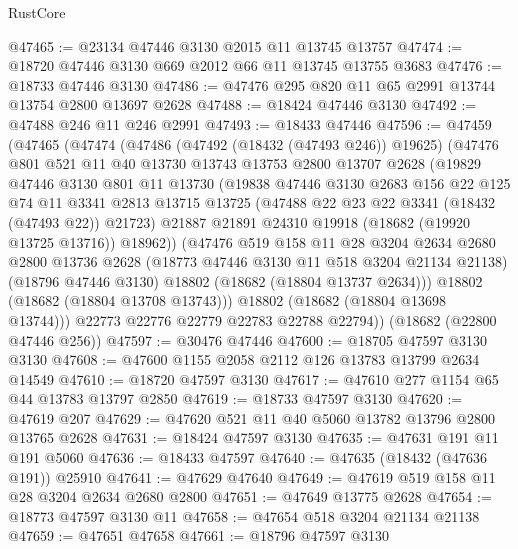 \begin{lexlean}{RustCore}
\begin{coremodule}
@47465 := @23134 @47446 @3130 @2015 @11 @13745 @13757
@47474 := @18720 @47446 @3130 @669 @2012 @66 @11 @13745 @13755 @3683
@47476 := @18733 @47446 @3130
@47486 := @47476 @295 @820 @11 @65 @2991 @13744 @13754 @2800 @13697 @2628
@47488 := @18424 @47446 @3130
@47492 := @47488 @246 @11 @246 @2991
@47493 := @18433 @47446
@47596 := @47459
    (@47465
      (@47474
        (@47486
          (@47492 (@18432 (@47493 @246)) @19625)
          (@47476
            @801
            @521
            @11
            @40
            @13730
            @13743
            @13753
            @2800
            @13707
            @2628
            (@19829
              @47446
              @3130
              @801
              @11
              @13730
              (@19838
                @47446
                @3130
                @2683
                @156
                @22
                @125
                @74
                @11
                @3341
                @2813
                @13715
                @13725
                (@47488 @22 @23 @22 @3341 (@18432 (@47493 @22)) @21723)
                @21887
                @21891
                @24310
                @19918
                (@18682 (@19920 @13725 @13716))
                @18962))
            (@47476
              @519
              @158
              @11
              @28
              @3204
              @2634
              @2680
              @2800
              @13736
              @2628
              (@18773 @47446 @3130 @11 @518 @3204 @21134 @21138)
              (@18796 @47446 @3130)
              @18802
              (@18682 (@18804 @13737 @2634)))
            @18802
            (@18682 (@18804 @13708 @13743)))
          @18802
          (@18682 (@18804 @13698 @13744)))
        @22773
        @22776
        @22779
        @22783
        @22788
        @22794))
    (@18682 (@22800 @47446 @256))
@47597 := @30476 @47446
@47600 := @18705 @47597 @3130 @3130
@47608 := @47600 @1155 @2058 @2112 @126 @13783 @13799 @2634 @14549
@47610 := @18720 @47597 @3130
@47617 := @47610 @277 @1154 @65 @44 @13783 @13797 @2850
@47619 := @18733 @47597 @3130
@47620 := @47619 @207
@47629 := @47620 @521 @11 @40 @5060 @13782 @13796 @2800 @13765 @2628
@47631 := @18424 @47597 @3130
@47635 := @47631 @191 @11 @191 @5060
@47636 := @18433 @47597
@47640 := @47635 (@18432 (@47636 @191)) @25910
@47641 := @47629 @47640
@47649 := @47619 @519 @158 @11 @28 @3204 @2634 @2680 @2800
@47651 := @47649 @13775 @2628
@47654 := @18773 @47597 @3130 @11
@47658 := @47654 @518 @3204 @21134 @21138
@47659 := @47651 @47658
@47661 := @18796 @47597 @3130

\end{coremodule}
\end{lexlean}
